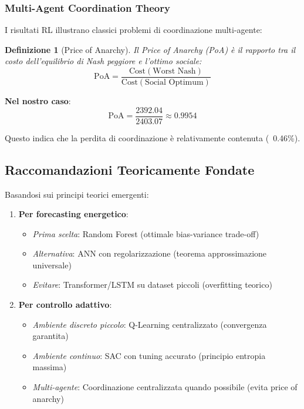 \documentclass[12pt,a4paper,twoside]{report}
\newtheorem{definition}{Definizione}[section]
\begin{document}
\begin{appendices}
\subsubsection{Multi-Agent Coordination Theory}

I risultati RL illustrano classici problemi di coordinazione multi-agente:

\begin{definition}[Price of Anarchy]
Il Price of Anarchy (PoA) è il rapporto tra il costo dell'equilibrio di Nash peggiore e l'ottimo sociale:
$$\text{PoA} = \frac{\text{Cost}(\text{Worst Nash})}{\text{Cost}(\text{Social Optimum})}$$
\end{definition}

\textbf{Nel nostro caso}:
$$\text{PoA} = \frac{2392.04}{2403.07} \approx 0.9954$$

Questo indica che la perdita di coordinazione è relativamente contenuta (~0.46\%).

\subsection{Raccomandazioni Teoricamente Fondate}

Basandosi sui principi teorici emergenti:

\begin{enumerate}
    \item \textbf{Per forecasting energetico}: 
    \begin{itemize}
        \item \textit{Prima scelta}: Random Forest (ottimale bias-variance trade-off)
        \item \textit{Alternativa}: ANN con regolarizzazione (teorema approssimazione universale)
        \item \textit{Evitare}: Transformer/LSTM su dataset piccoli (overfitting teorico)
    \end{itemize}
    
    \item \textbf{Per controllo adattivo}:
    \begin{itemize}
        \item \textit{Ambiente discreto piccolo}: Q-Learning centralizzato (convergenza garantita)
        \item \textit{Ambiente continuo}: SAC con tuning accurato (principio entropia massima)
        \item \textit{Multi-agente}: Coordinazione centralizzata quando possibile (evita price of anarchy)
    \end{itemize}
    

\end{enumerate}
\end{appendices}
\end{document}

